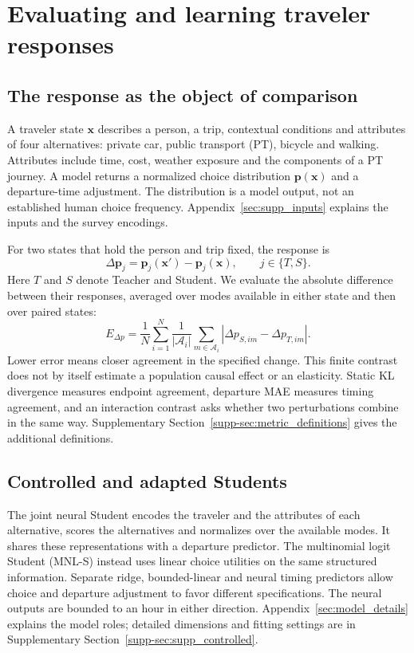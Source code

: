 \section{Evaluating and learning traveler responses}
\label{sec:method}
\subsection{The response as the object of comparison}
\label{sec:states}
A traveler state $\mathbf x$ describes a person, a trip, contextual conditions and attributes of four alternatives: private car, public transport (PT), bicycle and walking. Attributes include time, cost, weather exposure and the components of a PT journey. A model returns a normalized choice distribution $\mathbf p(\mathbf x)$ and a departure-time adjustment. The distribution is a model output, not an established human choice frequency. Appendix~\ref{sec:supp_inputs} explains the inputs and the survey encodings.

For two states that hold the person and trip fixed, the response is
\begin{equation}
\Delta\mathbf p_j=\mathbf p_j(\mathbf x')-\mathbf p_j(\mathbf x),\qquad j\in\{T,S\}.
\label{eq:response}
\end{equation}
Here $T$ and $S$ denote Teacher and Student. We evaluate the absolute difference between their responses, averaged over modes available in either state and then over paired states:
\begin{equation}
E_{\Delta p}=\frac{1}{N}\sum_{i=1}^{N}\frac{1}{|\mathcal A_i|}
\sum_{m\in\mathcal A_i}|\Delta p_{S,im}-\Delta p_{T,im}|.
\label{eq:response_metric_main}
\end{equation}
Lower error means closer agreement in the specified change. This finite contrast does not by itself estimate a population causal effect or an elasticity. Static KL divergence measures endpoint agreement, departure MAE measures timing agreement, and an interaction contrast asks whether two perturbations combine in the same way. Supplementary Section~\ref{supp-sec:metric_definitions} gives the additional definitions.

\subsection{Controlled and adapted Students}
\label{sec:architectures}
The joint neural Student encodes the traveler and the attributes of each alternative, scores the alternatives and normalizes over the available modes. It shares these representations with a departure predictor. The multinomial logit Student (MNL-S) instead uses linear choice utilities on the same structured information. Separate ridge, bounded-linear and neural timing predictors allow choice and departure adjustment to favor different specifications. The neural outputs are bounded to an hour in either direction. Appendix~\ref{sec:model_details} explains the model roles; detailed dimensions and fitting settings are in Supplementary Section~\ref{supp-sec:supp_controlled}.

